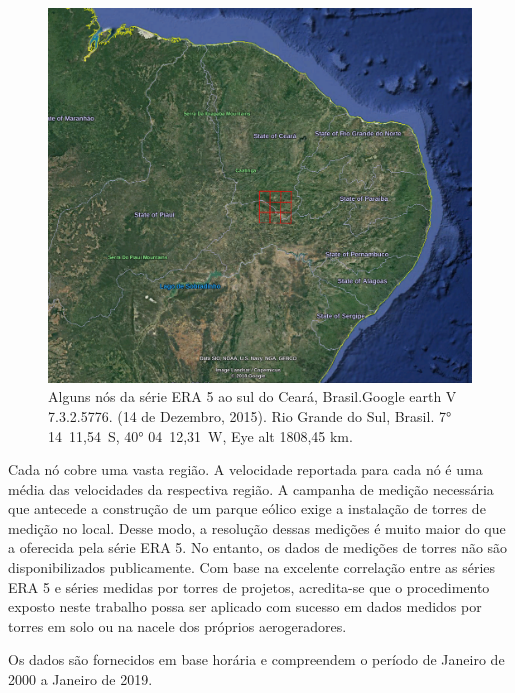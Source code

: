 \documentclass[
	12pt,				%
	openright,			%
	oneside,			%
	a4paper,			%
	english,			%
	french,				%
	spanish,			%
	brazil				%
	]{abntex2}
\begin{document}
\begin{figure}[h]
    \centering
	\includegraphics[width=\textwidth]{era5nodes}
	\caption{Alguns nós da série ERA 5 ao sul do Ceará, Brasil.\newline Google earth V 7.3.2.5776. (14 de Dezembro, 2015). Rio Grande do Sul, Brasil.
\ang{7} 14\textquotesingle\ 11,54\textquotesingle\textquotesingle\ S, \ang{40} 04\textquotesingle\ 12,31\textquotesingle\textquotesingle\ W, Eye alt 1808,45 km.}
\end{figure}
\FloatBarrier

Cada nó cobre uma vasta região. A velocidade reportada para cada nó é uma média das velocidades da respectiva região. A campanha de medição necessária que antecede a construção de um parque eólico exige a instalação de torres de medição no local. Desse modo, a resolução dessas medições é muito maior do que a oferecida pela série ERA 5. No entanto, os dados de medições de torres não são disponibilizados publicamente. Com base na excelente correlação entre as séries ERA 5 e séries medidas por torres de projetos, acredita-se que o procedimento exposto neste trabalho possa ser aplicado com sucesso em dados medidos por torres em solo ou na nacele dos próprios aerogeradores.



Os dados são fornecidos em base horária e compreendem o período de Janeiro de 2000 a Janeiro de 2019. 
\end{document}
